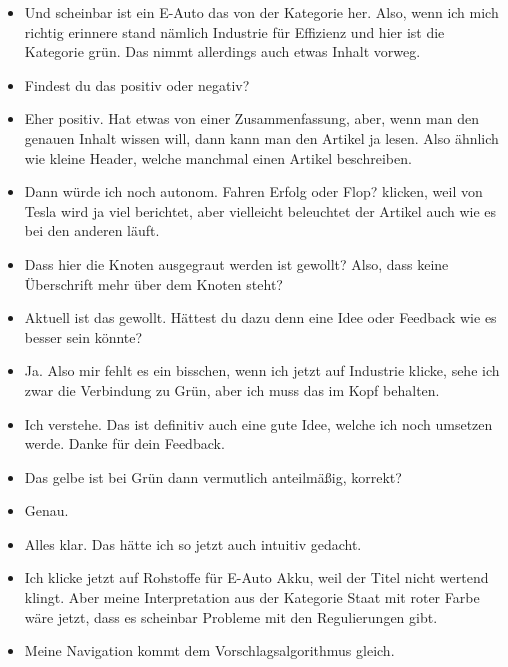 {\begin{itemize}[]
                  Vielleicht auch, um zu sehen, wie energieeffizient das Auto ist.
                  Also speziell im Vergleich zu einem Verbrenner.
            \item {} Und scheinbar ist ein E-Auto das von der Kategorie her.
                  Also, wenn ich mich richtig erinnere stand nämlich Industrie für Effizienz und hier ist die Kategorie grün.
                  Das nimmt allerdings auch etwas Inhalt vorweg.
            \item {} Findest du das positiv oder negativ?
            \item {} Eher positiv.
                  Hat etwas von einer Zusammenfassung, aber, wenn man den genauen Inhalt wissen will, dann kann man den Artikel ja lesen.
                  Also ähnlich wie kleine Header, welche manchmal einen Artikel beschreiben.
            \item {} Dann würde ich noch \flqq autonom. Fahren Erfolg oder Flop?\frqq{} klicken, weil von Tesla wird ja viel berichtet, aber vielleicht beleuchtet der Artikel auch wie es bei den anderen läuft.
            \item {} Dass hier die Knoten ausgegraut werden ist gewollt?
                  Also, dass keine Überschrift mehr über dem Knoten steht?
            \item {} Aktuell ist das gewollt. Hättest du dazu denn eine Idee oder Feedback wie es besser sein könnte?
            \item {} Ja. Also mir fehlt es ein bisschen, wenn ich jetzt auf Industrie klicke, sehe ich zwar die Verbindung zu Grün, aber ich muss das im Kopf behalten.
            \item {} Ich verstehe. Das ist definitiv auch eine gute Idee, welche ich noch umsetzen werde. Danke für dein Feedback.
            \item {} Das gelbe ist bei Grün dann vermutlich anteilmäßig, korrekt?
            \item {} Genau.
            \item {} Alles klar. Das hätte ich so jetzt auch intuitiv gedacht.
            \item {} Ich klicke jetzt auf \flqq Rohstoffe für E-Auto Akku\frqq{}, weil der Titel nicht wertend klingt.
                  Aber meine Interpretation aus der Kategorie Staat mit roter Farbe wäre jetzt, dass es scheinbar Probleme mit den Regulierungen gibt.
            \item {} Meine Navigation kommt dem Vorschlagsalgorithmus gleich.

\end{itemize}}
